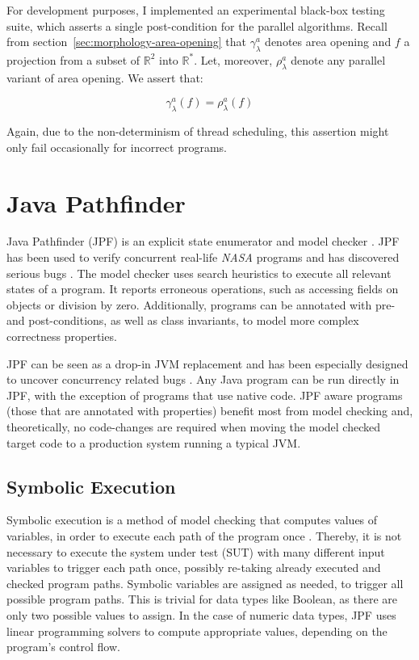 For development purposes, I implemented an experimental black-box testing suite,
which asserts a single post-condition for the parallel algorithms. Recall from
section~\ref{sec:morphology-area-opening} that $\gamma^a_{\lambda}$ denotes area
opening and $f$ a projection from a subset of $\mathbb{R}^2$ into
$\mathbb{R}^*$. Let, moreover, $\rho^a_{\lambda}$ denote any parallel variant of
area opening. We assert that:

\begin{equation}
  \label{eq:correctness-experimental-post}
  \gamma^a_{\lambda}(f) = \rho^a_{\lambda}(f)
\end{equation}

Again, due to the non-determinism of thread scheduling, this assertion might
only fail occasionally for incorrect programs.

\section{Java Pathfinder}
\label{sec:correctness-jpf}

Java Pathfinder (JPF) is an explicit state enumerator and model checker
\cite{Visser2003Model}. JPF has been used to verify concurrent real-life
\emph{NASA} programs and has discovered serious bugs \cite{Visser2004Test}. The
model checker uses search heuristics to execute all relevant states of a
program. It reports erroneous operations, such as accessing fields on
 objects or division by zero. Additionally, programs can be
annotated with pre- and post-conditions, as well as class invariants, to model
more complex correctness properties.

JPF can be seen as a drop-in JVM replacement and has been especially designed to
uncover concurrency related bugs \cite{Visser2003Model}. Any Java program can be
run directly in JPF, with the exception of programs that use native code. JPF
aware programs (those that are annotated with properties) benefit most from
model checking and, theoretically, no code-changes are required when moving the
model checked target code to a production system running a typical JVM.

\subsection{Symbolic Execution}
\label{sec:correctness-jpf-symbolic}

Symbolic execution is a method of model checking that computes values of
variables, in order to execute each path of the program once
\cite{Khurshid2003Generalized}. Thereby, it is not necessary to execute the
system under test (SUT) with many different input variables to trigger each path
once, possibly re-taking already executed and checked program paths. Symbolic
variables are assigned as needed, to trigger all possible program paths. This is
trivial for data types like Boolean, as there are only two possible values to
assign. In the case of numeric data types, JPF uses linear programming solvers
to compute appropriate values, depending on the program's control flow.

